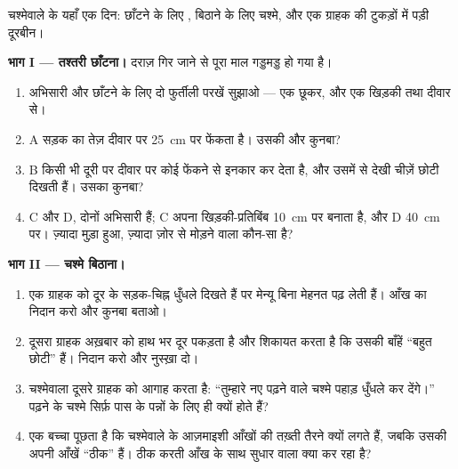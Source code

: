 \begin{problem}\label{pb:g8:lenses-images:1}
चश्मेवाले के यहाँ एक दिन: छाँटने के लिए , बिठाने के लिए चश्मे, और
एक ग्राहक की टुकड़ों में पड़ी दूरबीन।

\medskip\noindent\textbf{भाग I --- तश्तरी छाँटना।}
दराज़ गिर जाने से पूरा माल गड्डमड्ड हो गया है।
\begin{enumerate}
  \item अभिसारी और  छाँटने के लिए दो फुर्तीली परखें सुझाओ
        --- एक छूकर, और एक खिड़की तथा दीवार से।
  \item {} A सड़क का तेज़  दीवार पर \qty{25}{cm} पर फेंकता
        है। उसकी  और कुनबा?
  \item {} B किसी भी दूरी पर दीवार पर कोई  फेंकने से इनकार
        कर देता है, और उसमें से देखी चीज़ें छोटी दिखती हैं। उसका
        कुनबा?
  \item {} C और D, दोनों अभिसारी हैं; C अपना खिड़की-प्रतिबिंब
        \qty{10}{cm} पर बनाता है, और D \qty{40}{cm} पर। ज़्यादा मुड़ा
        हुआ, ज़्यादा ज़ोर से मोड़ने वाला  कौन-सा है?
\end{enumerate}

\medskip\noindent\textbf{भाग II --- चश्मे बिठाना।}
\begin{enumerate}[resume]
  \item एक ग्राहक को दूर के सड़क-चिह्न धुँधले दिखते हैं पर मेन्यू
        बिना मेहनत पढ़ लेती हैं। आँख का निदान करो और कुनबा बताओ।
  \item दूसरा ग्राहक अख़बार को हाथ भर दूर पकड़ता है और शिकायत करता है
        कि उसकी बाँहें ``बहुत छोटी'' हैं। निदान करो और नुस्ख़ा दो।
  \item चश्मेवाला दूसरे ग्राहक को आगाह करता है: ``तुम्हारे नए पढ़ने
        वाले चश्मे पहाड़ धुँधले कर देंगे।'' पढ़ने के चश्मे सिर्फ़ पास
        के पन्नों के लिए ही क्यों होते हैं?
  \item एक बच्चा पूछता है कि चश्मेवाले के आज़माइशी  आँखों की
        तख़्ती तैरने क्यों लगते हैं, जबकि उसकी अपनी आँखें ``ठीक''
        हैं। ठीक  करती आँख के साथ सुधार वाला  क्या कर रहा है?
\end{enumerate}


\end{problem}
